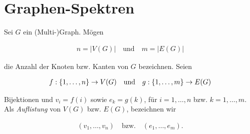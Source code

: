 
    \section{Graphen-Spektren}

        \begin{definition} \label{def:listing}

            Sei $G$ ein (Multi-)Graph.
            Mögen
            
            \begin{align*}
                n = |V(G)|
                \quad
                \text{und}
                \quad
                m = |E(G)|
            \end{align*}
            
            die Anzahl der Knoten bzw. Kanten von $G$ bezeichnen.
            Seien

            \begin{align*}
                f: {\left \{ 1, \dots, n \right \}} \to V(G)
                \quad
                \text{und}
                \quad
                g: {\left \{ 1, \dots, m \right \}} \to E(G)
            \end{align*}
            
            Bijektionen und $v_i = f(i)$ sowie $e_k = g(k)$, für $i = 1, \dots, n$ bzw. $k = 1, \dots, m$.
            Als \textit{Auflistung} von $V(G)$ bzw. $E(G)$, bezeichnen wir
            
            \begin{align*}
                (v_1, \dots, v_n)
                \quad
                \text{bzw.}
                \quad
                (e_1, \dots, e_m).
            \end{align*}

        \end{definition}

